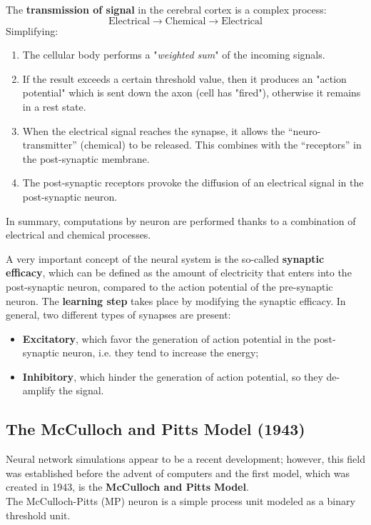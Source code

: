 The \textbf{transmission of signal} in the cerebral cortex is a complex process:
$$\text{Electrical} \rightarrow \text{Chemical} \rightarrow \text{Electrical}$$
Simplifying:
\begin{enumerate}
	\item The cellular body performs a "\textit{weighted sum}" of the incoming signals.
	\item If the result exceeds a certain threshold value, then it produces an "action potential" which is sent down the axon (cell has "fired"), otherwise it remains in a rest state.
	\item When the electrical signal reaches the synapse, it allows the ``neuro-transmitter'' (chemical) to be released. This combines with the ``receptors'' in the post-synaptic membrane.
	\item The post-synaptic receptors provoke the diffusion of an electrical signal in the post-synaptic neuron. 
\end{enumerate}
In summary, computations by neuron are performed thanks to a combination of electrical and chemical processes. 

A very important concept of the neural system is the so-called \textbf{synaptic efficacy}, which can be defined as the amount of electricity that enters into the post-synaptic neuron, compared to the action potential of the pre-synaptic neuron. The \textbf{learning step} takes place by modifying the synaptic efficacy. In general, two different types of synapses are present:
\begin{itemize}
	\item \textbf{Excitatory}, which favor the generation of action potential in the post-synaptic neuron, i.e. they tend to increase the energy;
	\item \textbf{Inhibitory}, which hinder the generation of action potential, so they de-amplify the signal.
\end{itemize}

\subsection{The McCulloch and Pitts Model (1943)}

Neural network simulations appear to be a recent development; however, this field was established before the advent of computers and the first model, which was created in 1943, is the \textbf{McCulloch and Pitts Model}.\\
The McCulloch-Pitts (MP) neuron is a simple process unit modeled as a binary threshold unit.

